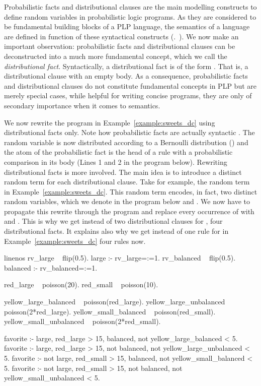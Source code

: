 Probabilistic facts and distributional clauses are the main modelling constructs to define random variables in probabilistic logic programs.
As they are considered to be fundamental building blocks of a PLP language, the semantics of a language are defined in function of these syntactical constructs (\cf.~\citep{fierens2015inference,gutmann2011magic}). 
We now make an important observation: probabilistic facts and distributional clauses can be deconstructed into a much more fundamental concept, which we call the {\em distributional fact}.  
Syntactically, a distributional fact is of the form . That is, a distributional clause with an empty body.
As a consequence, probabilistic facts and distributional clauses do not constitute fundamental concepts in PLP but are merely special cases, \ie while helpful for writing concise programs, they are only of secondary importance when it comes to semantics.


\begin{example}\label{ex:sweets_df}
We now rewrite the program in Example~\ref{example:sweets_dc} using distributional facts only. Note how probabilistic facts are actually syntactic . The random variable is now distributed according to a Bernoulli distribution () and the atom of the probabilistic fact is the head of a rule with a probabilistic comparison in its body (\eg Lines 1 and 2 in the program below). Rewriting distributional facts is more involved. The main idea is to introduce a distinct random term for each distributional clause. Take for example, the random term  in Example~\ref{example:sweets_dc}. This random term encodes, in fact, two distinct random variables, which we denote in the program below  and . We now have to propagate this rewrite through the program and replace every occurrence of  with  and . This is why we get instead of two distributional clauses for , four distributional facts. It explains also why we get instead of one rule for  in Example~\ref{example:sweets_dc} four rules now.

    \begin{problog*}{linenos}
rv_large ~ flip(0.5).
large :- rv_large=:=1.
rv_balanced ~ flip(0.5).
balanced :- rv_balanced=:=1.

red_large ~ poisson(20).
red_small ~ poisson(10).

yellow_large_balanced ~ poisson(red_large).
yellow_large_unbalanced ~ poisson(2*red_large).
yellow_small_balanced ~ poisson(red_small).
yellow_small_unbalanced ~ poisson(2*red_small).

favorite :- large, red_large > 15, 
              balanced, not yellow_large_balanced < 5.
favorite :- large, red_large > 15, 
              not balanced, not yellow_large_unbalanced < 5.
favorite :- not large, red_small > 15, 
              balanced, not yellow_small_balanced < 5.
favorite :- not large, red_small > 15, 
              not balanced, not yellow_small_unbalanced < 5.
\end{problog*}
\end{example}

